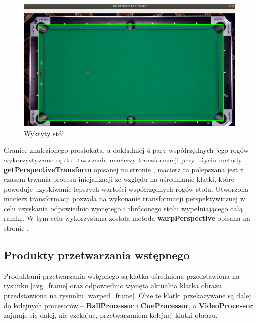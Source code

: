 \documentclass[12pt]{article}
\begin{document}
    \begin{figure}[!htb]
        \centering
        \includegraphics[width=15cm]{./images/obrazki/inicjalizacja/detected_pool_table.png}
        \caption{Wykryty stół.}
        \label{detected_pool_table}
    \end{figure}


    Granice znalezionego prostokąta, a dokładniej 4 pary współrzędnych jego rogów wykorzystywane są do utworzenia macierzy transformacji przy użyciu metody \textbf{getPerspectiveTransform} opisanej na stronie \cite{getPerspectiveTransform}, macierz ta polepszana jest z czasem trwania procesu inicjalizacji ze względu na uśrednianie klatki, które powoduje uzyskiwanie lepszych wartości współrzędnych rogów stołu. Utworzona macierz transformacji pozwala na wykonanie transformacji perspektywicznej w celu uzyskania odpowiednio wyciętego i obróconego stołu wypełniającego całą ramkę. W tym celu wykorzystana została metoda \textbf{warpPerspective} opisana na stronie \cite{warpPerspective}.  


\subsection{Produkty przetwarzania wstępnego}

Produktami przetwarzania wstępnego są klatka uśredniona przedstawiona na rysunku \ref{avg_frame} oraz odpowiednio wycięta aktualna klatka obrazu przedstawiona na rysunku \ref{warped_frame}. Obie te klatki przekazywane są dalej do kolejnych procesorów – \textbf{BallProcessor} i \textbf{CueProcessor}, a \textbf{VideoProcessor} zajmuje się dalej, nie czekając, przetwarzaniem kolejnej klatki obrazu.
\end{document}
